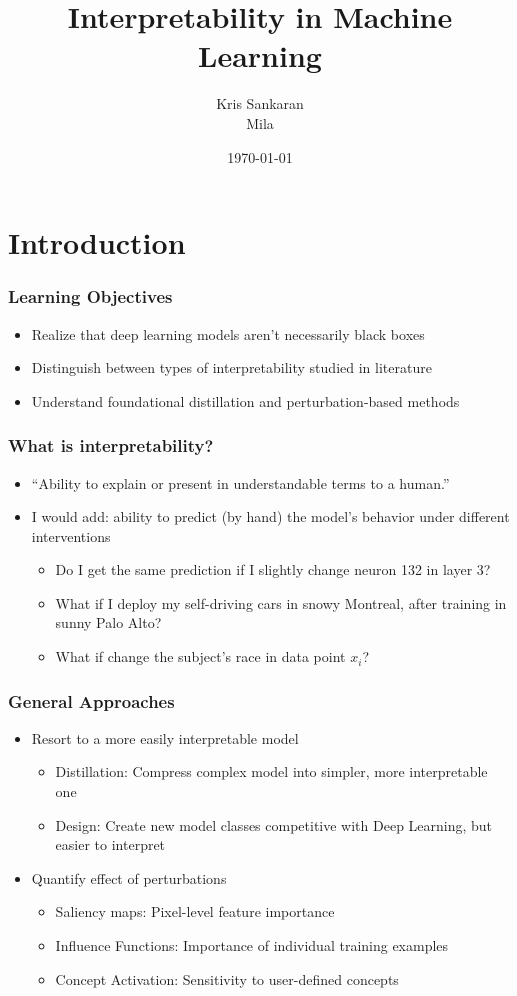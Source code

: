 \documentclass[10pt,mathserif]{beamer}
\title{\large \bfseries Interpretability in Machine Learning}
\author{Kris Sankaran\\[3ex]
Mila}
\date{\today}
\begin{document}
\frame{
  \thispagestyle{empty}
  \titlepage
}

\section{Introduction}

\begin{frame}
  \frametitle{Learning Objectives}
 \begin{itemize}
   \item Realize that deep learning models aren't necessarily black boxes
   \item Distinguish between types of interpretability studied in literature
   \item Understand foundational distillation and perturbation-based methods
 \end{itemize}
\end{frame}

\begin{frame}
  \frametitle{What is interpretability?}
  \begin{itemize}
  \item ``Ability to explain or present in
    understandable terms to a human.''
  \item I would add: ability to predict (by hand) the model's behavior under
    different interventions
    \begin{itemize}
      \item Do I get the same prediction if I slightly change neuron 132 in
        layer 3?
      \item What if I deploy my self-driving cars in snowy Montreal, after
        training in sunny Palo Alto?
      \item What if change the subject's race in data point $x_i$?
    \end{itemize}
  \end{itemize}
\end{frame}

\begin{frame}
  \frametitle{General Approaches}
  \begin{itemize}
  \item Resort to a more easily interpretable model
    \begin{itemize}
    \item Distillation: Compress complex model into simpler, more interpretable
      one
    \item Design: Create new model classes competitive with Deep Learning, but
      easier to interpret
    \end{itemize}
  \item Quantify effect of perturbations
    \begin{itemize}
    \item Saliency maps: Pixel-level feature importance
    \item Influence Functions: Importance of individual training examples
    \item Concept Activation: Sensitivity to user-defined concepts
    \end{itemize}
  \end{itemize}
\end{frame}
\end{document}
